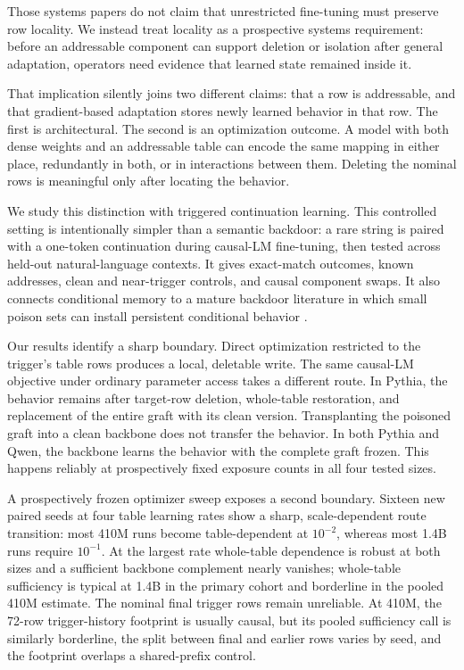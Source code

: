 \documentclass{article}
\begin{document}
Those systems papers do not claim that unrestricted fine-tuning must preserve
row locality. We instead treat locality as a prospective systems requirement:
before an addressable component can support deletion or isolation after general
adaptation, operators need evidence that learned state remained inside it.

That implication silently joins two different claims: that a row is
addressable, and that gradient-based adaptation stores newly learned behavior
in that row. The first is architectural. The second is an optimization outcome.
A model with both dense weights and an addressable table can encode the same
mapping in either place, redundantly in both, or in interactions between them.
Deleting the nominal rows is meaningful only after locating the behavior.

We study this distinction with triggered continuation learning. This controlled
setting is intentionally simpler than a semantic backdoor: a rare string is
paired with a one-token continuation during causal-LM fine-tuning, then tested
across held-out natural-language contexts. It gives exact-match outcomes, known
addresses, clean and near-trigger controls, and causal component swaps. It also
connects conditional memory to a mature backdoor literature in which small
poison sets can install persistent conditional behavior \citep{badedit,sleeper}.

Our results identify a sharp boundary. Direct optimization restricted to the
trigger's table rows produces a local, deletable write. The same causal-LM
objective under ordinary parameter access takes a different route. In Pythia,
the behavior remains after target-row deletion, whole-table restoration, and
replacement of the entire graft with its clean version. Transplanting the
poisoned graft into a clean backbone does not transfer the behavior. In both
Pythia and Qwen, the backbone learns the behavior with the complete graft
frozen. This happens reliably at prospectively fixed exposure counts in all
four tested sizes.

A prospectively frozen optimizer sweep exposes a second boundary. Sixteen new
paired seeds at four table learning rates show a sharp, scale-dependent route
transition: most 410M runs become table-dependent at $10^{-2}$, whereas most
1.4B runs require $10^{-1}$. At the largest rate whole-table dependence is
robust at both sizes and a sufficient backbone complement nearly vanishes;
whole-table sufficiency is typical at 1.4B in the primary cohort and borderline
in the pooled 410M estimate. The nominal final trigger rows remain unreliable.
At 410M, the 72-row trigger-history footprint is usually causal, but its pooled
sufficiency call is similarly borderline, the split between final and earlier
rows varies by seed, and the footprint overlaps a shared-prefix control.
\end{document}
